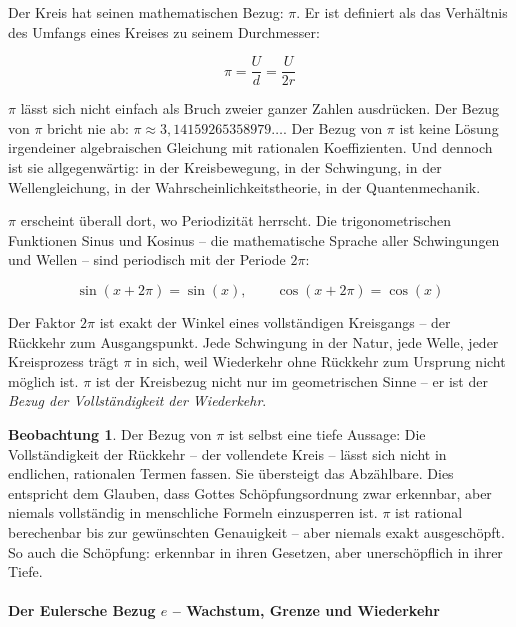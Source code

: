 ﻿\documentclass[a4paper,12pt]{article}
\theoremstyle{definition}
\newtheorem{observation}{Beobachtung}[section]
\begin{document}
Der Kreis hat seinen mathematischen Bezug: $\pi$. Er ist definiert
als das Verhältnis des Umfangs eines Kreises zu seinem Durchmesser:

\begin{equation}
	\pi = \frac{U}{d} = \frac{U}{2r}
\end{equation}

$\pi$ lässt sich nicht einfach als Bruch zweier ganzer Zahlen
ausdrücken. Der Bezug von $\pi$ bricht nie ab: $\pi \approx 3{,}14159265358979 \ldots$. Der Bezug von $\pi$ ist keine Lösung irgendeiner algebraischen Gleichung mit rationalen Koeffizienten. Und dennoch ist sie allgegenwärtig: in der Kreisbewegung, in der Schwingung, in der Wellengleichung, in der Wahrscheinlichkeitstheorie, in der Quantenmechanik.

$\pi$ erscheint überall dort, wo Periodizität herrscht. Die trigonometrischen
Funktionen Sinus und Kosinus -- die mathematische Sprache aller Schwingungen und
Wellen -- sind periodisch mit der Periode $2\pi$:

\begin{equation}
	\sin(x + 2\pi) = \sin(x), \qquad \cos(x + 2\pi) = \cos(x)
\end{equation}

Der Faktor $2\pi$ ist exakt der Winkel eines vollständigen Kreisgangs -- der
Rückkehr zum Ausgangspunkt. Jede Schwingung in der Natur, jede Welle, jeder
Kreisprozess trägt $\pi$ in sich, weil Wiederkehr ohne Rückkehr zum Ursprung
nicht möglich ist. $\pi$ ist der Kreisbezug nicht nur im geometrischen Sinne --
er ist der \textit{Bezug der Vollständigkeit der Wiederkehr}.

\begin{observation}
	Der Bezug von $\pi$ ist selbst eine tiefe Aussage: Die Vollständigkeit
	der Rückkehr -- der vollendete Kreis -- lässt sich nicht in endlichen, rationalen
	Termen fassen. Sie übersteigt das Abzählbare. Dies entspricht dem Glauben, dass
	Gottes Schöpfungsordnung zwar erkennbar, aber niemals vollständig in menschliche
	Formeln einzusperren ist. $\pi$ ist rational berechenbar bis zur gewünschten
	Genauigkeit -- aber niemals exakt ausgeschöpft. So auch die Schöpfung: erkennbar
	in ihren Gesetzen, aber unerschöpflich in ihrer Tiefe.
\end{observation}

\paragraph{Der Eulersche Bezug $e$ -- Wachstum, Grenze und Wiederkehr}
\end{document}
